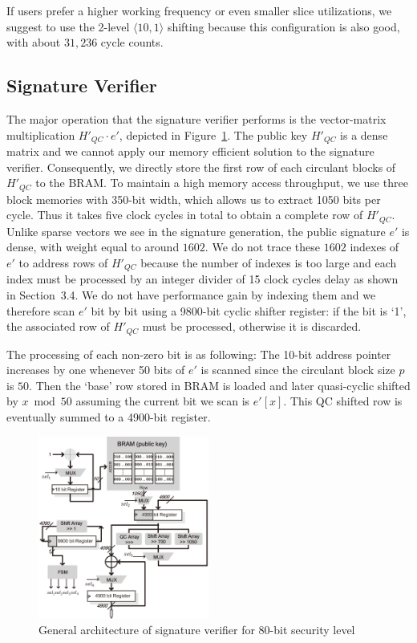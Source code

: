 \documentclass[10pt,journal,compsoc]{IEEEtran}
\begin{document}
If users prefer a higher working frequency or even smaller slice utilizations, we suggest to use the 2-level $\langle 10,1\rangle$ shifting because this configuration is also good, with about $31,236$ cycle counts.



\subsection{Signature Verifier}
The major operation that the signature verifier performs is the vector-matrix multiplication $H'_{QC}\cdot e'$, depicted in Figure~\ref{fig:sigverify}.
The public key  $H'_{QC}$ is a dense matrix and we cannot apply our memory efficient solution to the signature verifier.  Consequently, we directly store the first row of each circulant blocks of $H'_{QC}$ to the BRAM. To maintain a high memory access throughput, we use three block memories with 350-bit width, which allows us to extract 1050 bits per cycle. Thus it takes five clock cycles in total to obtain a complete row of $H'_{QC}$.
Unlike sparse vectors we see in the signature generation, the public signature $e'$ is dense, with weight equal to around $1602$. We do not trace these $1602$ indexes of $e'$ to address rows of $H'_{QC}$ because the number of indexes is too large and each index must be processed by an integer divider of 15 clock cycles delay as shown in Section~3.4. We do not have performance gain by indexing them and we therefore scan $e'$ bit by bit using a 9800-bit cyclic shifter register: if the bit is  `1', the associated row of  $H'_{QC}$ must be processed, otherwise it is discarded.

The processing of each non-zero bit is as following: The 10-bit address pointer increases by one whenever 50 bits of $e'$ is scanned since the circulant block size $p$ is $50$. Then the `base' row stored in BRAM is loaded and later quasi-cyclic shifted by $x \bmod 50$ assuming the current bit we scan is $e'[x]$. This QC shifted row is eventually summed to a 4900-bit register.

\begin{figure}[!htb]\centering
      \includegraphics[width=0.5\textwidth]{./fig/sigverifier.eps}
  \caption{General architecture of signature verifier for 80-bit security level}\label{fig:sigverify}
\end{figure}
\end{document}
